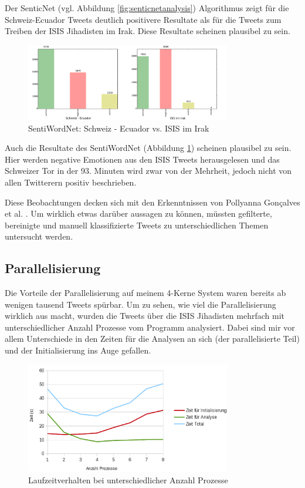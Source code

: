 Der SenticNet (vgl. Abbildung \ref{fig:senticnetanalysis}) Algorithmus zeigt für die Schweiz-Ecuador Tweets deutlich positivere Resultate als für die Tweets zum Treiben der ISIS Jihadisten im Irak. Diese Resultate scheinen plausibel zu sein.

\begin{figure}[h]
  \centering
  \includegraphics[width=0.8\textwidth]{images/schweizvsirak_sentiwordnet.pdf}
  \caption[SentiWordNet: Schweiz - Ecuador vs. ISIS im Irak]{SentiWordNet: Schweiz - Ecuador vs. ISIS im Irak}
  \label{fig:sentiwordnet}
\end{figure}

Auch die Resultate des SentiWordNet (Abbildung \ref{fig:sentiwordnet}) scheinen plausibel zu sein. Hier werden negative Emotionen aus den ISIS Tweets herausgelesen und das Schweizer Tor in der 93. Minuten wird zwar von der Mehrheit, jedoch nicht von allen Twitterern positiv beschrieben.

Diese Beobachtungen decken sich mit den Erkenntnissen von Pollyanna Gonçalves et al. \cite{comparing}. Um wirklich etwas darüber aussagen zu können, müssten gefilterte, bereinigte und manuell klassifizierte Tweets zu unterschiedlichen Themen untersucht werden.

\clearpage
\subsection{Parallelisierung}
Die Vorteile der Parallelisierung auf meinem 4-Kerne System waren bereits ab wenigen tausend Tweets spürbar. Um zu sehen, wie viel die Parallelisierung wirklich aus macht, wurden die Tweets über die ISIS Jihadisten mehrfach mit unterschiedlicher Anzahl Prozesse vom Programm analysiert. Dabei sind mir vor allem Unterschiede in den Zeiten für die Analysen an sich (der parallelisierte Teil) und der Initialisierung ins Auge gefallen. 

\begin{figure}[h]
  \centering
  \includegraphics[width=0.8\textwidth]{images/parallelisierung_chart.png}
  \caption[Laufzeitverhalten bei unterschiedlicher Anzahl Prozesse]{Laufzeitverhalten bei unterschiedlicher Anzahl Prozesse}
  \label{fig:analyseparallel}
\end{figure}


